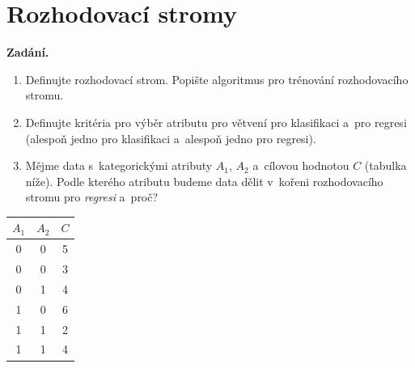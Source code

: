 \section{Rozhodovací stromy}

\noindent\textbf{Zadání.}\par
\begin{enumerate}
  \item Definujte rozhodovací strom. Popište algoritmus pro trénování rozhodovacího stromu.
  \item Definujte kritéria pro výběr atributu pro větvení pro klasifikaci a~pro regresi (alespoň jedno pro klasifikaci a~alespoň jedno pro regresi).
  \item Mějme data s~kategorickými atributy $A_1$, $A_2$ a~cílovou hodnotou $C$ (tabulka níže). Podle kterého atributu budeme data dělit v~kořeni rozhodovacího stromu pro \emph{regresi} a~proč?
\end{enumerate}

\begin{center}
\begin{tabular}{ccc}
\toprule
$A_1$ & $A_2$ & $C$ \\
\midrule
0 & 0 & 5 \\
0 & 0 & 3 \\
0 & 1 & 4 \\
1 & 0 & 6 \\
1 & 1 & 2 \\
1 & 1 & 4 \\
\bottomrule
\end{tabular}
\end{center}

